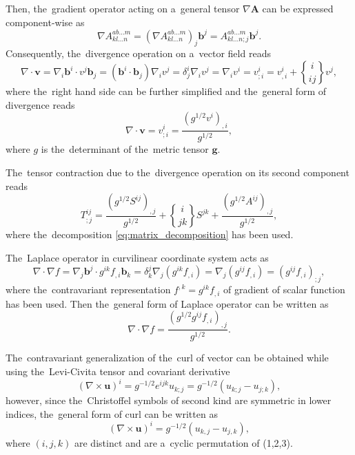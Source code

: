 \documentclass[preprint,12pt]{elsarticle}
\newcommand{\vect}[1]{\boldsymbol{#1}}
\newcommand{\matr}[1]{\mathbf{#1}}
\newcommand{\christ}[3]{\genfrac{\{}{\}}{0pt}{}{#1}{#2 #3}}
\newcounter{bla}
\begin{document}
Then, the~gradient operator acting on a~general tensor $\nabla \matr{A}$ can
be expressed component-wise as
\begin{equation}
  \nabla A^{ab...m}_{kl...n} = (\nabla A^{ab...m}_{kl...n})_j\vect{b}^j 
  = A^{ab...m}_{kl...n;j}\vect{b}^j .
  \label{eq:general_grad}
\end{equation}
Consequently, the~divergence operation on a~vector field reads
\begin{equation}
  \nabla\cdot\vect{v} = \nabla_i\vect{b}^i\cdot v^j\vect{b}_j 
  = (\vect{b}^i\cdot\vect{b}_j) \nabla_i v^j = \delta^i_j \nabla_i v^j
  = \nabla_i v^i = v^i_{;i} = v^i_{,i} + \christ{i}{i}{j}v^j ,
  \nonumber
\end{equation}
where the~right hand side can be further simplified and the~general form
of divergence reads
\begin{equation}
  \nabla\cdot\vect{v} = v^i_{;i} = \frac{(g^{1/2}v^i)_{,i}}{g^{1/2}} ,
  \label{eq:general_divvec}
\end{equation}
where $g$ is the~determinant of the~metric tensor $\matr{g}$.

The~tensor contraction due to the~divergence operation on its second component
reads
\begin{equation}
  T^{ij}_{;j} = \frac{(g^{1/2}S^{ij})_{,j}}{g^{1/2}} + \christ{i}{j}{k}S^{jk} 
  + \frac{(g^{1/2}A^{ij})_{,j}}{g^{1/2}} ,
  \label{eq:general_divtens}
\end{equation}
where the~decomposition \eqref{eq:matrix_decomposition} has been used.

The~Laplace operator in curvilinear coordinate system acts as
\begin{equation}
  \nabla\cdot\nabla f = \nabla_j\vect{b}^j\cdot g^{ik}f_{,i}\vect{b}_k = 
  \delta^j_k \nabla_j (g^{ik}f_{,i}) = \nabla_j (g^{ij}f_{,i}) 
  = (g^{ij}f_{,i})_{;j} , 
  \nonumber
\end{equation}
where the~contravariant representation $f^{,k} = g^{ik}f_{,i}$ of gradient
of scalar function has been used.
Then the~general form of Laplace operator can be written as
\begin{equation}
  \nabla\cdot\nabla f = \frac{(g^{1/2}g^{ij}f_{,i})_{,j}}{g^{1/2}} .
  \label{eq:general_Laplace}
\end{equation}

The~contravariant generalization of the~curl of vector can be obtained while
using the~Levi-Civita tensor and covariant derivative
\begin{equation}
  (\nabla\times\vect{u})^i = g^{-1/2}e^{ijk} u_{k;j} 
  = g^{-1/2} (u_{k;j} - u_{j;k}) ,
  \nonumber
\end{equation} 
however, since the~Christoffel symbols of second kind are symmetric in lower 
indices, the~general form of curl can be written as 
\begin{equation}
  (\nabla\times\vect{u})^i = g^{-1/2} (u_{k,j} - u_{j,k}) ,
  \label{eq:general_curlvec}
\end{equation} 
where $(i,j,k)$ are distinct and are a~cyclic permutation of (1,2,3).
\end{document}
